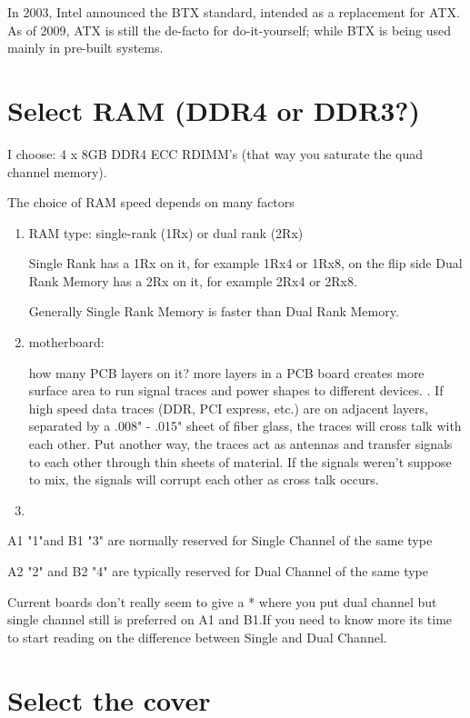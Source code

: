  In 2003, Intel announced the BTX standard, intended as a replacement for ATX.
 As of 2009, ATX is still the de-facto for do-it-yourself; while BTX is being
 used mainly in pre-built systems.
 
\section{Select RAM (DDR4 or DDR3?)}

I choose: 4 x 8GB DDR4 ECC RDIMM’s  (that way you saturate the quad channel memory).

The choice of RAM speed depends on many factors
\begin{enumerate}
  \item RAM type: single-rank (1Rx) or dual rank (2Rx)
  
  Single Rank has a 1Rx on it, for example 1Rx4 or 1Rx8, on the flip side Dual
  Rank Memory has a 2Rx on it, for example 2Rx4 or 2Rx8.
  
  Generally Single Rank Memory is faster than Dual Rank Memory.
  
  
  \item  motherboard:
  
  how many PCB layers on it?  more layers in a PCB board creates more surface
  area to run signal traces and power shapes to different devices.
  . If high speed data traces (DDR, PCI express, etc.) are on adjacent layers,
  separated by a .008" - .015" sheet of fiber glass, the traces will cross talk
  with each other. Put another way, the traces act as antennas and transfer
  signals to each other through thin sheets of material. If the signals weren't
  suppose to mix, the signals will corrupt each other as cross talk occurs.
  
  
  \item 
\end{enumerate}

A1 "1"and B1 "3" are normally reserved for Single Channel of the same type

A2 "2" and B2 "4" are typically reserved for Dual Channel of the same type

Current boards don't really seem to give a * where you put dual channel but
single channel still is preferred on A1 and B1.If you need to know more its time
to start reading on the difference between Single and Dual Channel.


\section{Select the cover}

